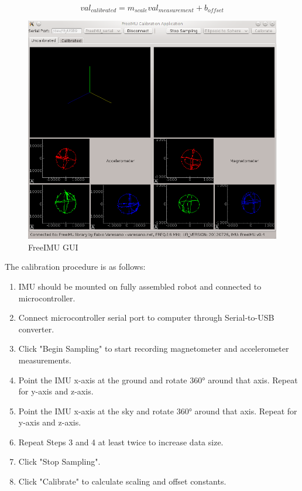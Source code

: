 \begin{equation}
val_{calibrated} = m_{scale} val_{measurement} + b_{offset}
\end{equation}

\begin{figure}[H]   %
	\centering \includegraphics[width=6in, keepaspectratio]{figures/cal_gui.png}
	\caption{FreeIMU GUI \cite{freeimu}}\label{fig:cal_gui}
\end{figure}

The calibration procedure is as follows:
\begin{enumerate}
	\item \ssp IMU should be mounted on fully assembled robot and connected to microcontroller.
	\item \ssp Connect microcontroller serial port to computer through Serial-to-USB converter.
	\item \ssp Click "Begin Sampling" to start recording magnetometer and accelerometer measurements.
	\item \ssp Point the IMU x-axis at the ground and rotate \ang{360} around that axis. Repeat for y-axis and z-axis.
	\item \ssp Point the IMU x-axis at the sky and rotate \ang{360} around that axis. Repeat for y-axis and z-axis.
	\item \ssp Repeat Steps 3 and 4 at least twice to increase data size.
	\item \ssp Click "Stop Sampling".
	\item \ssp Click "Calibrate" to calculate scaling and offset constants.
\end{enumerate}

